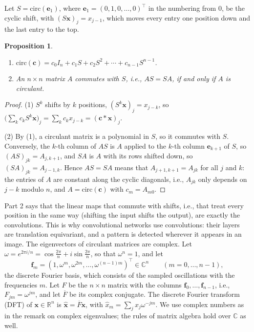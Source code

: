 \documentclass[11pt]{article}
\theoremstyle{definition}
\theoremstyle{plain}
\newtheorem{proposition}[definition]{Proposition}
\theoremstyle{remark}
\begin{document}
Let $S = \mathrm{circ}(\mathbf{e}_1)$, where $\mathbf{e}_1 = (0, 1, 0, \ldots, 0)^\top$ in the numbering from $0$, be the cyclic shift, with $(S\mathbf{x})_j = x_{j-1}$, which moves every entry one position down and the last entry to the top.

\begin{proposition}\label{prop:circulant-shift}
    \begin{enumerate}
        \item $\mathrm{circ}(\mathbf{c}) = c_0I_n + c_1S + c_2S^2 + \cdots + c_{n-1}S^{n-1}$.
        \item An $n \times n$ matrix $A$ commutes with $S$, i.e., $AS = SA$, if and only if $A$ is circulant.
    \end{enumerate}
\end{proposition}

\begin{proof}
    (1) $S^k$ shifts by $k$ positions, $(S^k\mathbf{x})_j = x_{j-k}$, so $\big(\sum_k c_kS^k\mathbf{x}\big)_j = \sum_k c_kx_{j-k} = (\mathbf{c} \ast \mathbf{x})_j$.

    (2) By (1), a circulant matrix is a polynomial in $S$, so it commutes with $S$. Conversely, the $k$-th column of $AS$ is $A$ applied to the $k$-th column $\mathbf{e}_{k+1}$ of $S$, so $(AS)_{jk} = A_{j,k+1}$, and $SA$ is $A$ with its rows shifted down, so $(SA)_{jk} = A_{j-1,k}$. Hence $AS = SA$ means that $A_{j+1,k+1} = A_{jk}$ for all $j$ and $k$: the entries of $A$ are constant along the cyclic diagonals, i.e., $A_{jk}$ only depends on $j - k$ modulo $n$, and $A = \mathrm{circ}(\mathbf{c})$ with $c_m = A_{m0}$.
\end{proof}

Part 2 says that the linear maps that commute with shifts, i.e., that treat every position in the same way (shifting the input shifts the output), are exactly the convolutions. This is why convolutional networks use convolutions: their layers are translation equivariant, and a pattern is detected wherever it appears in an image. The eigenvectors of circulant matrices are complex. Let $\omega = e^{2\pi i/n} = \cos\frac{2\pi}{n} + i\sin\frac{2\pi}{n}$, so that $\omega^n = 1$, and let
\[\mathbf{f}_m = (1, \omega^m, \omega^{2m}, \ldots, \omega^{(n-1)m})^\top \in \mathbb{C}^n \qquad (m = 0, \ldots, n - 1),\]
the discrete Fourier basis, which consists of the sampled oscillations with the frequencies $m$. Let $F$ be the $n \times n$ matrix with the columns $\mathbf{f}_0, \ldots, \mathbf{f}_{n-1}$, i.e., $F_{jm} = \omega^{jm}$, and let $\overline{F}$ be its complex conjugate. The discrete Fourier transform (DFT) of $\mathbf{x} \in \mathbb{R}^n$ is $\hat{\mathbf{x}} = \overline{F}\mathbf{x}$, with $\hat{x}_m = \sum_j x_j\omega^{-jm}$. We use complex numbers as in the remark on complex eigenvalues; the rules of matrix algebra hold over $\mathbb{C}$ as well.
\end{document}
